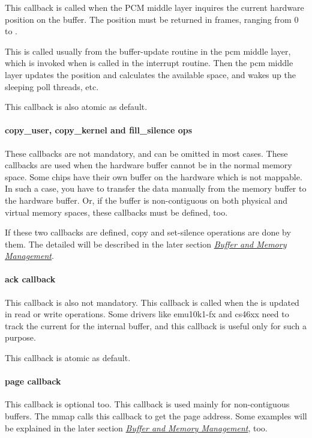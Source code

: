 \documentclass[a4paper,8pt,english]{sphinxmanual}
\begin{document}
This callback is called when the PCM middle layer inquires the current
hardware position on the buffer. The position must be returned in
frames, ranging from 0 to .

This is called usually from the buffer-update routine in the pcm
middle layer, which is invoked when 
is called in the interrupt routine. Then the pcm middle layer updates
the position and calculates the available space, and wakes up the
sleeping poll threads, etc.

This callback is also atomic as default.


\paragraph{copy\_user, copy\_kernel and fill\_silence ops}
\label{sound/kernel-api/writing-an-alsa-driver:copy-user-copy-kernel-and-fill-silence-ops}
These callbacks are not mandatory, and can be omitted in most cases.
These callbacks are used when the hardware buffer cannot be in the
normal memory space. Some chips have their own buffer on the hardware
which is not mappable. In such a case, you have to transfer the data
manually from the memory buffer to the hardware buffer. Or, if the
buffer is non-contiguous on both physical and virtual memory spaces,
these callbacks must be defined, too.

If these two callbacks are defined, copy and set-silence operations
are done by them. The detailed will be described in the later section
{\hyperref[sound/kernel\string-api/writing\string-an\string-alsa\string-driver:buffer\string-and\string-memory\string-management]{\emph{Buffer and Memory Management}}}.


\paragraph{ack callback}
\label{sound/kernel-api/writing-an-alsa-driver:ack-callback}
This callback is also not mandatory. This callback is called when the
 is updated in read or write operations. Some drivers like
emu10k1-fx and cs46xx need to track the current  for the
internal buffer, and this callback is useful only for such a purpose.

This callback is atomic as default.


\paragraph{page callback}
\label{sound/kernel-api/writing-an-alsa-driver:page-callback}
This callback is optional too. This callback is used mainly for
non-contiguous buffers. The mmap calls this callback to get the page
address. Some examples will be explained in the later section {\hyperref[sound/kernel\string-api/writing\string-an\string-alsa\string-driver:buffer\string-and\string-memory\string-management]{\emph{Buffer
and Memory Management}}}, too.
\end{document}
